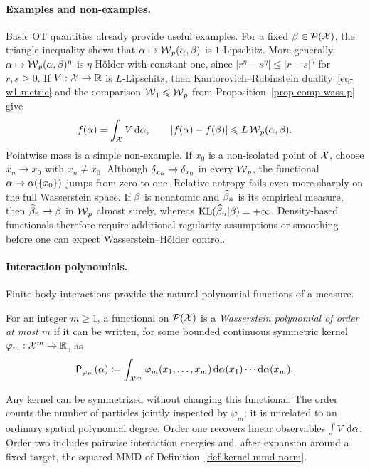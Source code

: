 \paragraph{Examples and non-examples.}

Basic OT quantities already provide useful examples. For a fixed \(\beta\in\mathcal{P}(\mathcal{X})\), the triangle inequality shows that \(\alpha\mapsto\operatorname{\mathcal{W}}_p(\alpha,\beta)\) is \(1\)-Lipschitz. More generally, \(\alpha\mapsto\operatorname{\mathcal{W}}_p(\alpha,\beta)^\eta\) is \(\eta\)-H\"older with constant one, since \(|r^\eta-s^\eta|\leq|r-s|^\eta\) for \(r,s\geq0\). If \(V:\mathcal{X}\to\mathbb{R}\) is \(L\)-Lipschitz, then Kantorovich--Rubinstein duality~\eqref{eq-w1-metric} and the comparison \(\operatorname{\mathcal{W}}_1\leqslant\operatorname{\mathcal{W}}_p\) from Proposition~\ref{prop-comp-wass-p} give
\[
	f(\alpha)=\int_{\mathcal{X}} V\,\mathrm{d}\alpha,
	\qquad
	|f(\alpha)-f(\beta)|\leqslant L\operatorname{\mathcal{W}}_p(\alpha,\beta).
\]
Pointwise mass is a simple non-example. If \(x_0\) is a non-isolated point of \(\mathcal{X}\), choose \(x_n\to x_0\) with \(x_n\neq x_0\). Although \(\delta_{x_n}\to\delta_{x_0}\) in every \(\operatorname{\mathcal{W}}_p\), the functional \(\alpha\mapsto\alpha(\{x_0\})\) jumps from zero to one. Relative entropy fails even more sharply on the full Wasserstein space. If \(\beta\) is nonatomic and \(\widehat{\beta}_n\) is its empirical measure, then \(\widehat{\beta}_n\to\beta\) in \(\operatorname{\mathcal{W}}_p\) almost surely, whereas \(\operatorname{KL}(\widehat{\beta}_n|\beta)=+\infty\). Density-based functionals therefore require additional regularity assumptions or smoothing before one can expect Wasserstein--H\"older control.

\paragraph{Interaction polynomials.}

Finite-body interactions provide the natural polynomial functions of a measure.

\begin{defn}\label{def-wasserstein-polynomial}
	For an integer \(m\geq1\), a functional on \(\mathcal{P}(\mathcal{X})\) is a \emph{Wasserstein polynomial of order at most \(m\)} if it can be written, for some bounded continuous symmetric kernel \(\varphi_m:\mathcal{X}^m\to\mathbb{R}\), as
	\begin{equation}\label{eq-wasserstein-interaction-polynomial}
		\mathsf P_{\varphi_m}(\alpha)
		\coloneqq
		\int_{\mathcal{X}^m}\varphi_m(x_1,\ldots,x_m)
		\,\mathrm{d}\alpha(x_1)\cdots\mathrm{d}\alpha(x_m).
	\end{equation}
\end{defn}
Any kernel can be symmetrized without changing this functional. The order counts the number of particles jointly inspected by \(\varphi_m\); it is unrelated to an ordinary spatial polynomial degree. Order one recovers linear observables \(\int V\,\mathrm{d}\alpha\). Order two includes pairwise interaction energies and, after expansion around a fixed target, the squared MMD of Definition~\ref{def-kernel-mmd-norm}.

